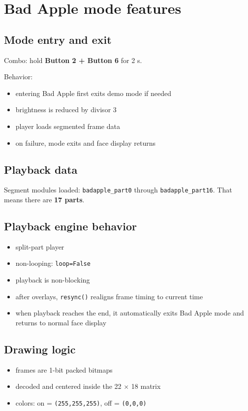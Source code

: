 \documentclass[11pt]{article}
\begin{document}
\section{Bad Apple mode features}
\subsection{Mode entry and exit}
Combo: hold \textbf{Button 2 + Button 6} for 2 s.

Behavior:
\begin{itemize}
  \item entering Bad Apple first exits demo mode if needed
  \item brightness is reduced by divisor 3
  \item player loads segmented frame data
  \item on failure, mode exits and face display returns
\end{itemize}

\subsection{Playback data}
Segment modules loaded:
\texttt{badapple\_part0} through \texttt{badapple\_part16}. That means there are \textbf{17 parts}.

\subsection{Playback engine behavior}
\begin{itemize}
  \item split-part player
  \item non-looping: \texttt{loop=False}
  \item playback is non-blocking
  \item after overlays, \texttt{resync()} realigns frame timing to current time
  \item when playback reaches the end, it automatically exits Bad Apple mode and returns to normal face display
\end{itemize}

\subsection{Drawing logic}
\begin{itemize}
  \item frames are 1-bit packed bitmaps
  \item decoded and centered inside the 22 $\times$ 18 matrix
  \item colors: on = \texttt{(255,255,255)}, off = \texttt{(0,0,0)}
\end{itemize}
\end{document}
